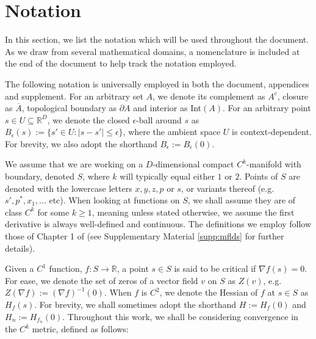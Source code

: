 \documentclass[11pt]{article}
\newcommand{\1}{\mathbf{1}}
\theoremstyle{definition}
\theoremstyle{remark}
\begin{document}
\section{Notation}\label{sec:notation}

In this section, we list the notation which will be used throughout the document. As we draw from several mathematical domains, a nomenclature is included at the end of the document to help track the notation employed.

The following notation is universally employed in both the document, appendices and supplement. For an arbitrary set $A$, we denote its complement as $A^c$, closure as $\overline{A}$, topological boundary as $\partial A$ and interior as Int$(A)$. For an arbitrary point $s \in U\subseteq \mathbb{R}^D$, we denote the closed $\epsilon$-ball around $s$ as $B_{\epsilon}(s):=\{s' \in U: |s-s'|\leq \epsilon\}$, where the ambient space $U$ is context-dependent. For brevity, we also adopt the shorthand $B_\epsilon:=B_\epsilon(0)$. 

We assume that we are working on a $D$-dimensional compact $C^k$-manifold with boundary, denoted $S$, where $k$ will typically equal either $1$ or $2$. Points of $S$ are denoted with the lowercase letters $x,y,z,p$ or $s$, or variants thereof (e.g. $s',p^*,x_1,...$ etc). When looking at functions on $S$, we shall assume they are of class $C^k$ for some $k\geq 1$, meaning unless stated otherwise, we assume the first derivative is always well-defined and continuous. The definitions we employ follow those of Chapter 1 of \cite{lee2013smooth} (see Supplementary Material \ref{supp:mflds} for further details). 

Given a $C^1$ function, $f:S\rightarrow \mathbb{R}$, a point $s \in S$ is said to be critical if $\nabla f(s)=0$. For ease, we denote the set of zeros of a vector field $v$ on $S$ as $Z(v)$, e.g. $Z(\nabla f):=(\nabla f)^{-1}(0)$. When $f$ is $C^2$, we denote the Hessian of $f$ at $s\in S$ as $H_f(s)$. For brevity, we shall sometimes adopt the shorthand $H:=H_f(0)$ and $H_n:=H_{f_n}(0)$. Throughout this work, we shall be considering convergence in the $C^k$ metric, defined as follows:
\end{document}
